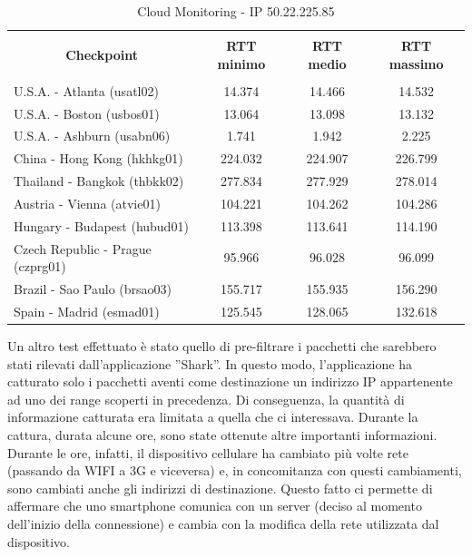 \documentclass[a4paper,11pt]{book}
\begin{document}
\begin{table}[!ht]
\begin{tabular}{|l|c|c|c|}
\hline
\multicolumn{1}{|c|}{\textbf{}} & {\textbf{}} & {\textbf{}} & {\textbf{}}\\
\multicolumn{1}{|c|}{\textbf{Checkpoint}} & {\textbf{RTT minimo}} & {\textbf{RTT medio}} & {\textbf{RTT massimo}}\\
\multicolumn{1}{|c|}{\textbf{}} & {\textbf{}} & {\textbf{}} & {\textbf{}}\\
\hline
U.S.A. - Atlanta (usatl02) & 14.374 & 14.466 & 14.532\\
U.S.A. - Boston (usbos01) & 13.064 & 13.098 & 13.132\\
U.S.A. - Ashburn (usabn06) & 1.741 & 1.942 & 2.225\\
China - Hong Kong (hkhkg01) & 224.032 & 224.907 & 226.799\\
Thailand - Bangkok (thbkk02) & 277.834 & 277.929 & 278.014\\
Austria - Vienna (atvie01) & 104.221 & 104.262 & 104.286\\
Hungary - Budapest (hubud01) & 113.398 & 113.641 & 114.190\\
Czech Republic - Prague (czprg01) & 95.966 & 96.028 & 96.099\\
Brazil - Sao Paulo (brsao03) & 155.717 & 155.935 & 156.290\\
Spain - Madrid (esmad01) & 125.545 & 128.065 & 132.618\\
\hline
\end{tabular}
\caption{Cloud Monitoring - IP 50.22.225.85}\label{table:Monitoring_5}
\end{table}

\clearpage

Un altro test effettuato \`e stato quello di pre-filtrare i pacchetti che sarebbero stati rilevati dall'applicazione ''Shark''. In questo modo, l'applicazione ha catturato solo i pacchetti aventi come destinazione un indirizzo IP appartenente ad uno dei range scoperti in precedenza.
Di conseguenza, la quantit\`a di informazione catturata era limitata a quella che ci interessava.
Durante la cattura, durata alcune ore, sono state ottenute altre importanti informazioni. Durante le ore, infatti, il dispositivo cellulare ha cambiato più volte rete (passando da WIFI a 3G e viceversa) e, in concomitanza con questi cambiamenti, sono cambiati anche gli indirizzi di destinazione.
Questo fatto ci permette di affermare che uno smartphone comunica con un server (deciso al momento dell'inizio della connessione) e cambia con la modifica della rete utilizzata dal dispositivo.
\end{document}
